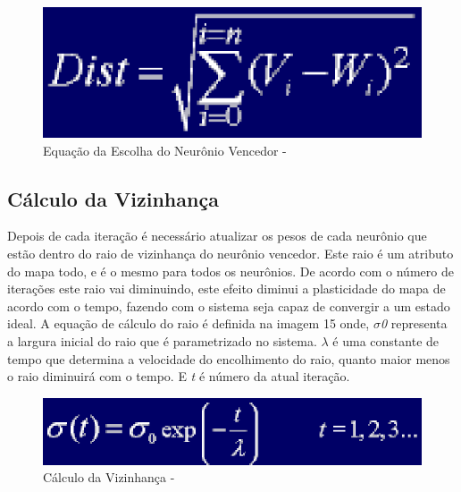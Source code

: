 \begin{figure}[!h]
\centering
\includegraphics[keepaspectratio=true,scale=0.60]
{figuras/distance.eps}
\caption{Equação da Escolha do Neurônio Vencedor - \cite{somaijk}}
\label{data_titatic}
\end{figure}

\subsection{Cálculo da Vizinhança}
Depois de cada iteração é necessário atualizar os pesos de cada neurônio que estão dentro do raio de vizinhança do neurônio vencedor. Este raio é um atributo do mapa todo, e é o mesmo para todos os neurônios. De acordo com o número de iterações este raio vai diminuindo, este efeito diminui a plasticidade do mapa de acordo com o tempo, fazendo com o sistema seja capaz de convergir a um estado ideal. A equação de cálculo do raio é definida na imagem 15 onde, \textit{$\sigma$0} representa a largura inicial do raio que é parametrizado no sistema. \textit{$\lambda$} é uma constante de tempo que determina a velocidade do encolhimento do raio, quanto maior menos o raio diminuirá com o tempo. E \textit{t} é número da atual iteração. 

\begin{figure}[!h]
\centering
\includegraphics[keepaspectratio=true,scale=0.60]
{figuras/raioviz.eps}
\caption{Cálculo da Vizinhança - \cite{somaijk}}
\label{data_titatic}
\end{figure} 

